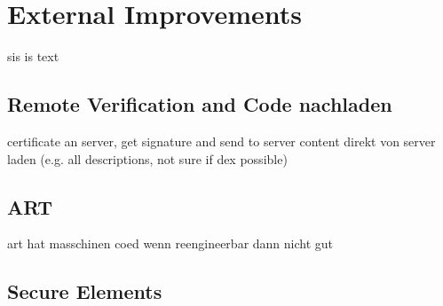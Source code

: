 \section{External Improvements}\label{section:external}
sis is text
\subsection{Remote Verification and Code nachladen}\label{subsection:external-remote}
certificate an server, get signature and send to server\newline
content direkt von server laden (e.g. all descriptions, not sure if dex possible)

\subsection{ART}\label{subsection:external-art}
art hat masschinen coed\newline
wenn reengineerbar dann nicht gut

\subsection{Secure Elements}\label{subsection:external-secure}

